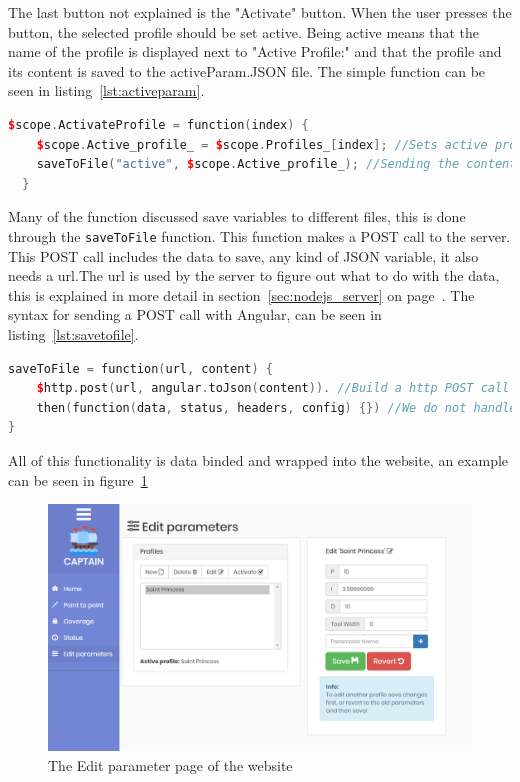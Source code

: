 The last button not explained is the "Activate" button. When the user presses the button, the selected profile should be set active. Being active means that the name of the profile is displayed next to "Active Profile:" and that the profile and its content is saved to the activeParam.JSON file. The simple function can be seen in listing~\ref{lst:activeparam}.

\begin{lstlisting}[caption = {ActivateProfile function in editParam.js}, captionpos=b, label={lst:activeparam}, language=C++,firstnumber=1]
$scope.ActivateProfile = function(index) {
    $scope.Active_profile_ = $scope.Profiles_[index]; //Sets active profile to be the profile at index in the list Profiles_
    saveToFile("active", $scope.Active_profile_); //Sending the content to the server to get saved.
  }
\end{lstlisting}

Many of the function discussed save variables to different files, this is done through the \texttt{saveToFile} function. This function makes a POST call to the server. This POST call includes the data to save, any kind of JSON variable, it also needs a url.The url is used by the server to figure out what to do with the data, this is explained in more detail in section~\ref{sec:nodejs_server}  on page~\pageref{sec:nodejs_server}. The syntax for sending a POST call with Angular, can be seen in listing~\ref{lst:savetofile}.

\begin{lstlisting}[caption = {saveToFile function in editParam.js}, captionpos=b, label={lst:savetofile}, language=C++,firstnumber=1]
saveToFile = function(url, content) {
	$http.post(url, angular.toJson(content)). //Build a http POST call with the url and content
	then(function(data, status, headers, config) {}) //We do not handle errors atm.
}
\end{lstlisting}

All of this functionality is data binded and wrapped into the website, an example can be seen in figure~\ref{fig:editpage}

\begin{figure}[H]
\centering
\includegraphics[width=0.9\linewidth]{Images/Implementation/edit_page}
\caption{The Edit parameter page of the website}
\label{fig:editpage}
\end{figure}

